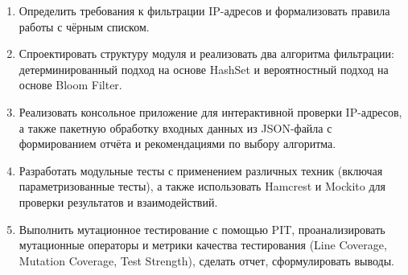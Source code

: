 \begin{enumerate}
	\item Определить требования к фильтрации IP-адресов и формализовать правила работы с чёрным списком.
	\item Спроектировать структуру модуля и реализовать два алгоритма фильтрации: детерминированный подход на основе HashSet и вероятностный подход на основе Bloom Filter.
	\item Реализовать консольное приложение для интерактивной проверки IP-адресов, а также пакетную обработку входных данных из JSON-файла с формированием отчёта и рекомендациями по выбору алгоритма.
	\item Разработать модульные тесты с применением различных техник (включая параметризованные тесты), а также использовать Hamcrest и Mockito для проверки результатов и взаимодействий.
	\item Выполнить мутационное тестирование с помощью PIT, проанализировать мутационные операторы и метрики качества тестирования (Line Coverage, Mutation Coverage, Test Strength), сделать отчет, сформулировать выводы.
\end{enumerate} 





